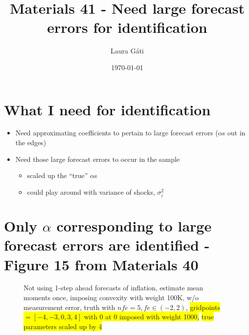 \documentclass[11pt]{article}
\def \myFigPath {../../figures/}
\renewcommand{\[}{\begin{equation}}
\renewcommand{\]}{\end{equation}}
\begin{document}
\linespread{1.0}

\title{Materials 41 - Need large forecast errors for identification}
\author{Laura G\'ati} 
\date{\today}
\maketitle


\tableofcontents


\newpage

\section{What I need for identification}
\begin{itemize}
\item Need approximating coefficients to pertain to large forecast errors ($\alpha$s out in the edges)
\item Need those large forecast errors to occur in the sample 
\begin{itemize}
\item scaled up the ``true'' $\alpha$s
\item could play around with variance of shocks, $\sigma^2_i$
\end{itemize}
\end{itemize}


\clearpage
\section{Only $\alpha$ corresponding to large forecast errors are identified - Figure 15 from Materials 40}

\begin{figure}[h!]
\caption{Not using 1-step ahead forecasts of inflation, estimate mean moments once, imposing convexity with weight 100K, w/o measurement error, truth with $nfe=5, fe \in(-2,2)$, \colorbox{yellow}{gridpoints $= [-4,-3,0,3,4]$ with 0 at 0 imposed with weight 1000,} \colorbox{yellow}{true parameters scaled up by 4}}
\end{figure}
\end{document}
